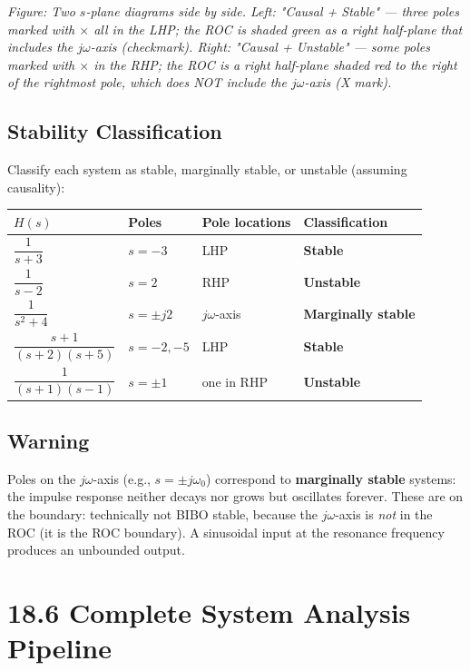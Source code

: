 \documentclass[11pt]{article}
\begin{document}
\textit{Figure: Two $s$-plane diagrams side by side. Left: "Causal + Stable" — three poles marked with $\times$ all in the LHP; the ROC is shaded green as a right half-plane that includes the $j\omega$-axis (checkmark). Right: "Causal + Unstable" — some poles marked with $\times$ in the RHP; the ROC is a right half-plane shaded red to the right of the rightmost pole, which does NOT include the $j\omega$-axis (X mark).}

\subsection*{Stability Classification}

Classify each system as stable, marginally stable, or unstable (assuming causality):

\begin{center}
\begin{tabular}{|l|l|l|l|}
\hline
\textbf{$H(s)$} & \textbf{Poles} & \textbf{Pole locations} & \textbf{Classification} \\
\hline
$\dfrac{1}{s+3}$ & $s = -3$ & LHP & \textbf{Stable} \\
\hline
$\dfrac{1}{s-2}$ & $s = 2$ & RHP & \textbf{Unstable} \\
\hline
$\dfrac{1}{s^2+4}$ & $s = \pm j2$ & $j\omega$-axis & \textbf{Marginally stable} \\
\hline
$\dfrac{s+1}{(s+2)(s+5)}$ & $s = -2, -5$ & LHP & \textbf{Stable} \\
\hline
$\dfrac{1}{(s+1)(s-1)}$ & $s = \pm 1$ & one in RHP & \textbf{Unstable} \\
\hline
\end{tabular}
\end{center}

\subsection*{Warning}

Poles on the $j\omega$-axis (e.g., $s = \pm j\omega_0$) correspond to \textbf{marginally stable} systems: the impulse response neither decays nor grows but oscillates forever. These are on the boundary: technically not BIBO stable, because the $j\omega$-axis is \textit{not} in the ROC (it is the ROC boundary). A sinusoidal input at the resonance frequency produces an unbounded output.

\section*{18.6 Complete System Analysis Pipeline}
\end{document}
